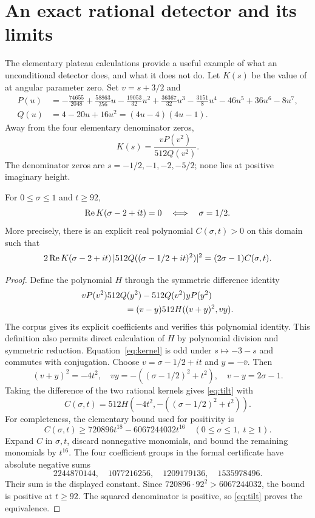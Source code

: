\section{An exact rational detector and its limits}

The elementary plateau calculations provide a useful example of what an unconditional detector does, and what it does not do. Let \(K(s)\) be the value of  at angular parameter zero. Set \(v=s+3/2\) and
\begin{align*}
 P(u)&=-\tfrac{74655}{2048}+\tfrac{58863}{256}u-\tfrac{19053}{32}u^2
 +\tfrac{36367}{32}u^3-\tfrac{3151}{8}u^4-46u^5+36u^6-8u^7,\\
 Q(u)&=4-20u+16u^2=(4u-4)(4u-1).
\end{align*}
Away from the four elementary denominator zeros,
\begin{equation}\label{eq:kernel}
 K(s)=\frac{vP(v^2)}{512Q(v^2)}.
\end{equation}
The denominator zeros are \(s=-1/2,-1,-2,-5/2\); none lies at positive imaginary height.

\begin{theorem}\label{thm:tilt}
For \(0\le\sigma\le1\) and \(t\ge92\),
\[
 \operatorname{Re} K(\sigma-2+it)=0\quad\Longleftrightarrow\quad\sigma=1/2.
\]
More precisely, there is an explicit real polynomial \(C(\sigma,t)>0\) on this domain such that
\begin{equation}\label{eq:tilt}
 2\operatorname{Re} K(\sigma-2+it)\,|512Q((\sigma-1/2+it)^2)|^2
      =(2\sigma-1)C(\sigma,t).
\end{equation}
\end{theorem}
\begin{proof}
Define the polynomial \(H\) through the symmetric difference identity
\begin{align*}
 &vP(v^2)512Q(y^2)-512Q(v^2)yP(y^2)\\
 &\hspace{18mm}=(v-y)512H((v+y)^2,vy).
\end{align*}
The corpus gives its explicit coefficients and verifies this polynomial identity. This definition also permits direct calculation of \(H\) by polynomial division and symmetric reduction. Equation~\eqref{eq:kernel} is odd under \(s\mapsto-3-s\) and commutes with conjugation. Choose \(v=\sigma-1/2+it\) and \(y=-\overline v\). Then
\[
 (v+y)^2=-4t^2,\quad vy=-((\sigma-1/2)^2+t^2),\quad v-y=2\sigma-1.
\]
Taking the difference of the two rational kernels gives \eqref{eq:tilt} with
\[
 C(\sigma,t)=512H(-4t^2,-((\sigma-1/2)^2+t^2)).
\]
For completeness, the elementary bound used for positivity is
\[
 C(\sigma,t)\ge720896t^{18}-6067244032t^{16}
 \quad(0\le\sigma\le1,\ t\ge1).
\]
Expand \(C\) in \(\sigma,t\), discard nonnegative monomials, and bound the remaining monomials by \(t^{16}\). The four coefficient groups in the formal certificate have absolute negative sums
\[
 2244870144,\quad1077216256,\quad1209179136,\quad1535978496.
\]
Their sum is the displayed constant. Since \(720896\cdot92^2>6067244032\), the bound is positive at \(t\ge92\). The squared denominator is positive, so \eqref{eq:tilt} proves the equivalence.
\end{proof}

